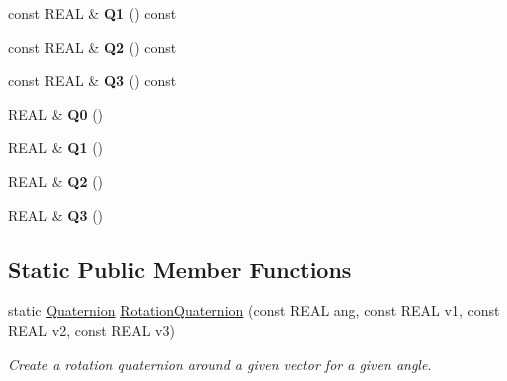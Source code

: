 \begin{DoxyCompactItemize}
\item 
\mbox{\label{class_obj_cryst_1_1_quaternion_a51ac63b5c094d911dc1d3452f48d2bda}} 
const R\+E\+AL \& {\bfseries Q1} () const
\item 
\mbox{\label{class_obj_cryst_1_1_quaternion_ad41716e665081b87c4015216eb83b60d}} 
const R\+E\+AL \& {\bfseries Q2} () const
\item 
\mbox{\label{class_obj_cryst_1_1_quaternion_ad7f5f525eb0d759893251eff4ff77922}} 
const R\+E\+AL \& {\bfseries Q3} () const
\item 
\mbox{\label{class_obj_cryst_1_1_quaternion_a55fcaea158c078037e490698b65928a5}} 
R\+E\+AL \& {\bfseries Q0} ()
\item 
\mbox{\label{class_obj_cryst_1_1_quaternion_af2d6ad820f768f36e4d27a1d8fe625d7}} 
R\+E\+AL \& {\bfseries Q1} ()
\item 
\mbox{\label{class_obj_cryst_1_1_quaternion_a3f9ee4f684da0981d5c746a4b2a4d473}} 
R\+E\+AL \& {\bfseries Q2} ()
\item 
\mbox{\label{class_obj_cryst_1_1_quaternion_ab17a674537eada0d4591fc99daa98e7e}} 
R\+E\+AL \& {\bfseries Q3} ()
\end{DoxyCompactItemize}
\subsection*{Static Public Member Functions}
\begin{DoxyCompactItemize}
\item 
\mbox{\label{class_obj_cryst_1_1_quaternion_a530f0de9cea9dc7ac595722a0a636e2a}} 
static \mbox{\hyperlink{class_obj_cryst_1_1_quaternion}{Quaternion}} \mbox{\hyperlink{class_obj_cryst_1_1_quaternion_a530f0de9cea9dc7ac595722a0a636e2a}{Rotation\+Quaternion}} (const R\+E\+AL ang, const R\+E\+AL v1, const R\+E\+AL v2, const R\+E\+AL v3)
\begin{DoxyCompactList}\small\item\em Create a rotation quaternion around a given vector for a given angle. \end{DoxyCompactList}\end{DoxyCompactItemize}


